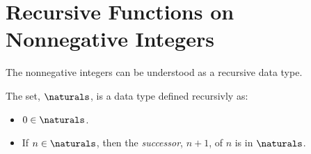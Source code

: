 \iffalse

Now suppose $s = \lefbrk\rhtbrk\lefbrk\rhtbrk\lefbrk\rhtbrk\lefbrk\rhtbrk$.



Let $a$ be the string $\lefbrk\lefbrk\rhtbrk\rhtbrk \in M$ built by two successive
applications of the first $M$ constructor starting with $\emptystring$.  Next
let $b \eqdef aa$ and $c \eqdef bb$, each built by successive applications
of the second $M$ constructor.

Alternatively, we can build $ba$ from the second constructor with $s=b$
and $t=a$, and then get to $c$ using the second constructor with $s=ba$
and $t=a$.

Now by these rules, $f(a) = 2$, and $f(b) = (2+1)(2+1)=9$.  This means
that $f(c) = f(bb)= (9+1)(9+1)=100$.

But also $f(ba) = (9+1)(2+1) = 27$, so that $f(c) = f(ba\,a) = (27 +1)
(2+1) = 84$.

The outcome is that $f(c)$ is defined to be both 100 and 84, which shows
that the rules defining $f$ are inconsistent.

On the other hand, structural induction remains a sound proof method even
for ambiguous recursive definitions, which is why it is easy to prove
that $M=\RM$.
\fi

\begin{problems}

\practiceproblems
{}

\classproblems
{}

\end{problems}


\section{Recursive Functions on Nonnegative Integers}

The nonnegative integers can be understood as a recursive data type.
\begin{definition}\label{0succ}
The set, $\naturals$, is a data type defined recursivly as:
\begin{itemize}
\item $0 \in \naturals$.
\item If $n \in \naturals$, then the \emph{successor}, $n+1$, of $n$ is in
$\naturals$.
\end{itemize}

\end{definition}

